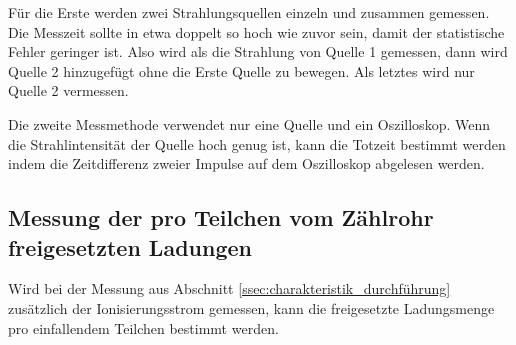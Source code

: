Für die Erste werden zwei Strahlungsquellen einzeln und zusammen gemessen.
Die Messzeit sollte in etwa doppelt so hoch wie zuvor sein, damit der statistische Fehler geringer ist.
Also wird als die Strahlung von Quelle 1 gemessen, dann wird Quelle 2 hinzugefügt ohne die Erste Quelle zu bewegen.
Als letztes wird nur Quelle 2 vermessen.

Die zweite Messmethode verwendet nur eine Quelle und ein Oszilloskop.
Wenn die Strahlintensität der Quelle hoch genug ist, kann die Totzeit bestimmt werden indem die Zeitdifferenz zweier Impulse auf dem Oszilloskop abgelesen werden.

\subsection{Messung der pro Teilchen vom Zählrohr freigesetzten Ladungen}
\label{ssec:ladungen_durchführung}

Wird bei der Messung aus Abschnitt \ref{ssec:charakteristik_durchführung} zusätzlich der Ionisierungsstrom gemessen, kann die freigesetzte Ladungsmenge pro einfallendem Teilchen bestimmt werden.